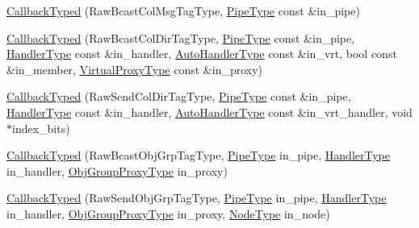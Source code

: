 \begin{DoxyCompactItemize}
\item 
\hyperlink{structvt_1_1pipe_1_1callback_1_1cbunion_1_1_callback_typed_a4b5c8df6aa46634bde0318f7b8017123}{Callback\+Typed} (Raw\+Bcast\+Col\+Msg\+Tag\+Type, \hyperlink{namespacevt_ac9852acda74d1896f48f406cd72c7bd3}{Pipe\+Type} const \&in\+\_\+pipe)
\item 
\hyperlink{structvt_1_1pipe_1_1callback_1_1cbunion_1_1_callback_typed_af5f0576f3858b3c81ebe3c4a28d3eca9}{Callback\+Typed} (Raw\+Bcast\+Col\+Dir\+Tag\+Type, \hyperlink{namespacevt_ac9852acda74d1896f48f406cd72c7bd3}{Pipe\+Type} const \&in\+\_\+pipe, \hyperlink{namespacevt_af64846b57dfcaf104da3ef6967917573}{Handler\+Type} const \&in\+\_\+handler, \hyperlink{structvt_1_1pipe_1_1callback_1_1cbunion_1_1_callback_raw_base_single_a734a9c83099de5bc1cd85f9da8dba7bb}{Auto\+Handler\+Type} const \&in\+\_\+vrt, bool const \&in\+\_\+member, \hyperlink{namespacevt_a1b417dd5d684f045bb58a0ede70045ac}{Virtual\+Proxy\+Type} const \&in\+\_\+proxy)
\item 
\hyperlink{structvt_1_1pipe_1_1callback_1_1cbunion_1_1_callback_typed_a9d258a1b9db65ef027a0e1185a9fe92e}{Callback\+Typed} (Raw\+Send\+Col\+Dir\+Tag\+Type, \hyperlink{namespacevt_ac9852acda74d1896f48f406cd72c7bd3}{Pipe\+Type} const \&in\+\_\+pipe, \hyperlink{namespacevt_af64846b57dfcaf104da3ef6967917573}{Handler\+Type} const \&in\+\_\+handler, \hyperlink{structvt_1_1pipe_1_1callback_1_1cbunion_1_1_callback_raw_base_single_a734a9c83099de5bc1cd85f9da8dba7bb}{Auto\+Handler\+Type} const \&in\+\_\+vrt\+\_\+handler, void $\ast$index\+\_\+bits)
\item 
\hyperlink{structvt_1_1pipe_1_1callback_1_1cbunion_1_1_callback_typed_a0be373f1ebb6916b873f329d82dd76ce}{Callback\+Typed} (Raw\+Bcast\+Obj\+Grp\+Tag\+Type, \hyperlink{namespacevt_ac9852acda74d1896f48f406cd72c7bd3}{Pipe\+Type} in\+\_\+pipe, \hyperlink{namespacevt_af64846b57dfcaf104da3ef6967917573}{Handler\+Type} in\+\_\+handler, \hyperlink{namespacevt_ad7cae989df485fccca57f0792a880a8e}{Obj\+Group\+Proxy\+Type} in\+\_\+proxy)
\item 
\hyperlink{structvt_1_1pipe_1_1callback_1_1cbunion_1_1_callback_typed_ac60ced3929a744b3953b7b96b4185c5b}{Callback\+Typed} (Raw\+Send\+Obj\+Grp\+Tag\+Type, \hyperlink{namespacevt_ac9852acda74d1896f48f406cd72c7bd3}{Pipe\+Type} in\+\_\+pipe, \hyperlink{namespacevt_af64846b57dfcaf104da3ef6967917573}{Handler\+Type} in\+\_\+handler, \hyperlink{namespacevt_ad7cae989df485fccca57f0792a880a8e}{Obj\+Group\+Proxy\+Type} in\+\_\+proxy, \hyperlink{namespacevt_a866da9d0efc19c0a1ce79e9e492f47e2}{Node\+Type} in\+\_\+node)

\end{DoxyCompactItemize}
